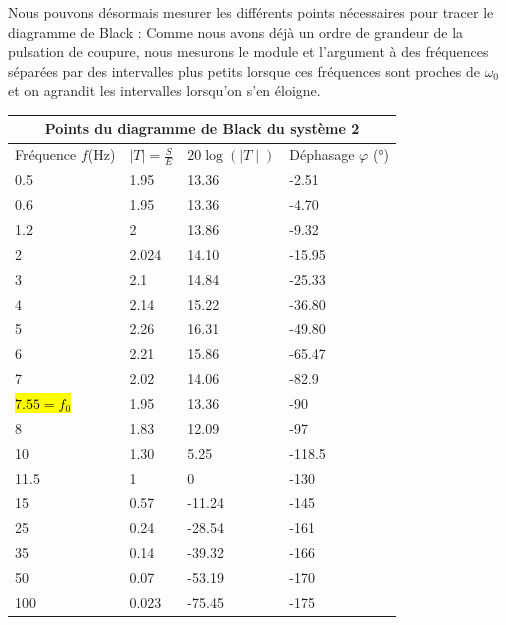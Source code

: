 \documentclass[12pt]{article}
\begin{document}
Nous pouvons désormais mesurer les différents points nécessaires pour tracer le diagramme de
Black :
Comme nous avons déjà un ordre de grandeur de la pulsation de coupure, nous mesurons le module
et l’argument à des fréquences séparées par des intervalles plus petits lorsque ces fréquences sont
proches de $\omega_0$ et on agrandit les intervalles lorsqu’on s’en éloigne.
\begin{center}
    \begin{tabular}{ |p{3cm}|p{3cm}|p{3cm}|p{3cm}| }
        \hline
        \multicolumn{4}{|c|}{Points du diagramme de Black du système 2} \\
        \hline
        Fréquence $f$(Hz) & $\mid T \mid = \frac{S}{E}$ & $20 \log(\mid T \mid)$ & Déphasage $\varphi $ (°)\\
        \hline
        0.5 & 1.95 & 13.36 & -2.51 \\
        0.6 & 1.95 & 13.36 & -4.70 \\
        1.2 & 2 & 13.86 & -9.32 \\
        2 & 2.024 &  14.10 & -15.95 \\
        3 & 2.1 &  14.84 & -25.33 \\
        4 & 2.14 &  15.22 & -36.80   \\
        5 & 2.26 & 16.31 & -49.80 \\
        6 & 2.21 & 15.86 & -65.47 \\
        7 & 2.02 & 14.06 & -82.9\\
        \hl{$7.55 = f_0$} & 1.95 & 13.36 & -90\\
        8 & 1.83 &  12.09 & -97 \\
        10 & 1.30 &  5.25 & -118.5 \\
        11.5 & 1 & 0 &-130 \\
        15 & 0.57 & -11.24 & -145 \\
        25 & 0.24 & -28.54 & -161 \\
        35 & 0.14 & -39.32 & -166 \\
        50 & 0.07 & -53.19 & -170 \\
        100 & 0.023 & -75.45 & -175 \\
        \hline
        \end{tabular}
    \end{center}

    \newpage
\end{document}
